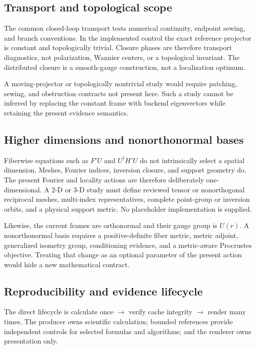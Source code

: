\documentclass[11pt]{article}
\begin{document}
\subsection{Transport and topological scope}

The common closed-loop transport tests numerical continuity, endpoint sewing, and branch
conventions. In the implemented control the exact reference projector is constant and topologically trivial.
Closure phases are therefore transport diagnostics, not polarization, Wannier centers,
or a topological invariant. The distributed closure is a smooth-gauge construction, not
a localization optimum.

A moving-projector or topologically nontrivial study would require patching, sewing, and
obstruction contracts not present here. Such a study cannot be inferred by replacing the
constant frame with backend eigenvectors while retaining the present evidence semantics.

\subsection{Higher dimensions and nonorthonormal bases}

Fiberwise equations such as $F'U$ and $U^\dagger H'U$ do not intrinsically select a
spatial dimension. Meshes, Fourier indices, inversion closure, and support geometry do.
The present Fourier and locality actions are therefore deliberately one-dimensional. A
2-D or 3-D study must define reviewed tensor or nonorthogonal reciprocal meshes,
multi-index representatives, complete point-group or inversion orbits, and a physical
support metric. No placeholder implementation is supplied.

Likewise, the current frames are orthonormal and their gauge group is $U(r)$. A
nonorthonormal basis requires a positive-definite fiber metric, metric adjoint,
generalized isometry group, conditioning evidence, and a metric-aware Procrustes
objective. Treating that change as an optional parameter of the present action would
hide a new mathematical contract.

\subsection{Reproducibility and evidence lifecycle}

The direct lifecycle is calculate once $\rightarrow$ verify cache integrity
$\rightarrow$ render many times. The producer owns scientific calculation; bounded
references provide independent controls for selected formulas and algorithms; and the
renderer owns presentation only.
\end{document}
